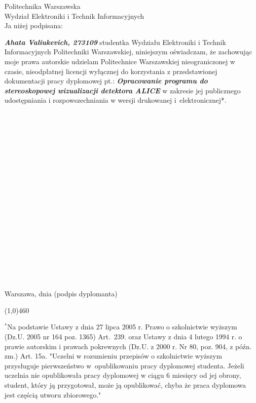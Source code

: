 \setcounter{page}{9}
\vspace{-1.5cm}
\begin{flushleft}
	Politechnika Warszawska \\ 
	Wydział Elektroniki i Technik Informacyjnych  \\
	\vspace{0.5cm}
	Ja niżej podpisana: 
\end{flushleft}
\center \textit{\textbf{Ahata Valiukevich, 273109}} %
\justify studentka Wydziału Elektroniki i Technik Informacyjnych Politechniki Warszawskiej, niniejszym oświadczam, że zachowując moje prawa autorskie udzielam Politechnice Warszawskiej nieograniczonej w czasie, nieodpłatnej licencji wyłącznej do korzystania z przedstawionej dokumentacji pracy dyplomowej pt.:
\center \textit{\textbf{ Opracowanie programu do stereoskopowej wizualizacji detektora ALICE}} 
\justify w zakresie jej publicznego udostępniania i rozpowszechniania w wersji drukowanej i~elektronicznej*.
\\~\\~\\~\\~\\~\\~\\~\\~\\~\\~\\~\\~\\~\\~\\~\\~\\~\\~\\~\\
Warszawa, dnia  \hfill (podpis dyplomanta) 

\begin{center}
	\color{sapphire}
	\line(1,0){460}
\end{center}
\footnotesize \noindent $^{*}$Na podstawie Ustawy z dnia 27 lipca 2005 r. Prawo o szkolnictwie wyższym (Dz.U. 2005 nr 164 poz. 1365) Art.~239. oraz Ustawy z dnia 4 lutego 1994 r. o prawie autorskim i prawach pokrewnych (Dz.U. z 2000 r. Nr 80, poz. 904, z późn. zm.) Art. 15a. "Uczelni w rozumieniu przepisów o szkolnictwie wyższym przysługuje pierwszeństwo w~opublikowaniu pracy dyplomowej studenta. Jeżeli uczelnia nie opublikowała pracy dyplomowej w ciągu 6 miesięcy od jej obrony, student, który ją przygotował, może ją opublikować, chyba że praca dyplomowa jest częścią utworu zbiorowego."

\newpage
\thispagestyle{empty}
\phantom{Nothing here}

